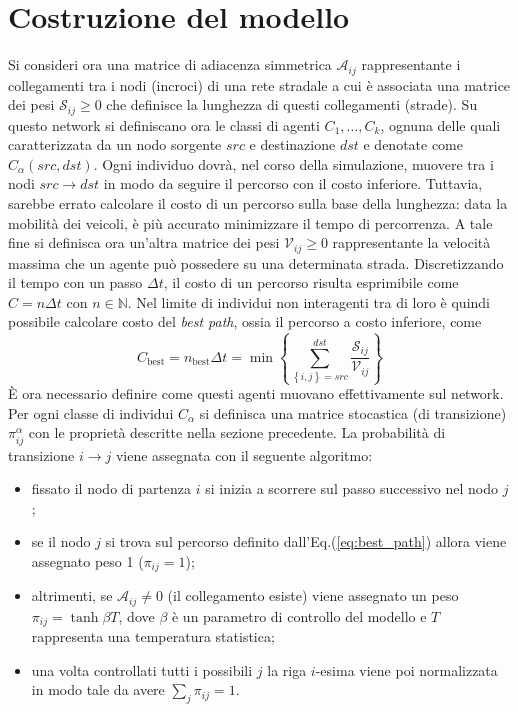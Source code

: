 \documentclass[../main.tex]{subfiles}
\begin{document}
\section{Costruzione del modello}
Si consideri ora una matrice di adiacenza simmetrica $\mathcal{A}_{ij}$ rappresentante i collegamenti tra i nodi (incroci) di una rete stradale a cui \`e associata una matrice dei pesi $\mathcal{S}_{ij} \geq 0$ che definisce la lunghezza di questi collegamenti (strade).
Su questo network si definiscano ora le classi di agenti $C_{1},\ldots,C_{k}$, ognuna delle quali caratterizzata da un nodo sorgente $src$ e destinazione $dst$ e denotate come $C_{\alpha}(src,dst)$.
Ogni individuo dovr\`a, nel corso della simulazione, muovere tra i nodi $src\to dst$ in modo da seguire il percorso con il costo inferiore.
Tuttavia, sarebbe errato calcolare il costo di un percorso sulla base della lunghezza: data la mobilit\`a dei veicoli, \`e pi\`u accurato minimizzare il tempo di percorrenza.
A tale fine si definisca ora un'altra matrice dei pesi $\mathcal{V}_{ij} \geq 0$ rappresentante la velocit\`a massima che un agente pu\`o possedere su una determinata strada.
Discretizzando il tempo con un passo $\Delta t$, il costo di un percorso risulta esprimibile come $C=n\Delta t$ con $n \in \mathbb{N}$.
Nel limite di individui non interagenti tra di loro \`e quindi possibile calcolare costo del \emph{best path}, ossia il percorso a costo inferiore, come
\begin{equation}
    C_{\text{best}} = n_{\text{best}}\Delta t = \min \left\{\sum_{\left\{i,j\right\}=src}^{dst}\frac{\mathcal{S}_{ij}}{\mathcal{V}_{ij}}\right\}
    \label{eq:best_path}
\end{equation}
\`E ora necessario definire come questi agenti muovano effettivamente sul network.
Per ogni classe di individui $C_{\alpha}$ si definisca una matrice stocastica (di transizione) $\pi_{ij}^{\alpha}$ con le propriet\`a descritte nella sezione precedente.
La probabilit\`a di transizione $i\to j$ viene assegnata con il seguente algoritmo:
\begin{itemize}
    \item fissato il nodo di partenza $i$ si inizia a scorrere sul passo successivo nel nodo $j$;
    \item se il nodo $j$ si trova sul percorso definito dall'Eq.(\ref{eq:best_path}) allora viene assegnato peso 1 ($\pi_{ij}=1$);
    \item altrimenti, se $\mathcal{A}_{ij} \neq 0$ (il collegamento esiste) viene assegnato un peso $\pi_{ij}=\tanh \beta T$, dove $\beta$ \`e un parametro di controllo del modello e $T$ rappresenta una temperatura statistica;
    \item una volta controllati tutti i possibili $j$ la riga $i$-esima viene poi normalizzata in modo tale da avere $\sum_j\pi_{ij}=1$.
\end{itemize}
\end{document}

